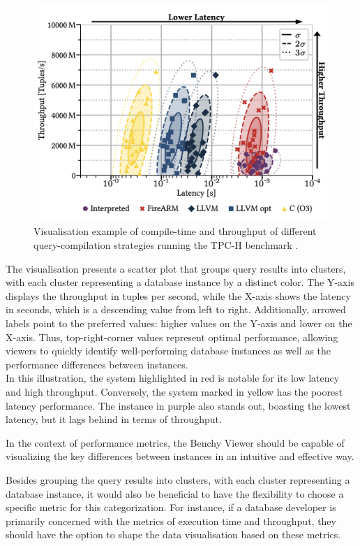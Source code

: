 \begin{figure}[h]
  \centering
  \includegraphics[width=0.8\linewidth]{figures/risc-metrcis-visualization.png}
  \caption{Visualisation example of compile-time and throughput of different query-compilation strategies running the TPC-H benchmark \cite{Bringin-Compiling-Databases-to-RISC}.}
  \label{fig:risc-metrics}
\end{figure}

\noindent

The visualisation presents a scatter plot that groups query results into clusters, with each cluster representing a database instance by a distinct color. The Y-axis displays the throughput in tuples per second, while the X-axis shows the latency in seconds, which is a descending value from left to right. Additionally, arrowed labels point to the preferred values: higher values on the Y-axis and lower on the X-axis. Thus, top-right-corner values represent optimal performance, allowing viewers to quickly identify well-performing database instances as well as the performance differences between instances.\\
In this illustration, the system highlighted in red is notable for its low latency and high throughput. Conversely, the system marked in yellow has the poorest latency performance. The instance in purple also stands out, boasting the lowest latency, but it lags behind in terms of throughput.

In the context of performance metrics, the Benchy Viewer should be capable of visualizing the key differences between instances in an intuitive and effective way. 

Besides grouping the query results into clusters, with each cluster representing a database instance, it would also be beneficial to have the flexibility to choose a specific metric for this categorization. For instance, if a database developer is primarily concerned with the metrics of execution time and throughput, they should have the option to shape the data visualisation based on these metrics.

